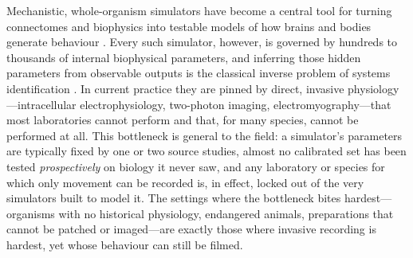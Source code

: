 \documentclass[11pt]{article}
\begin{document}
Mechanistic, whole-organism simulators have become a central tool for turning connectomes and biophysics into testable models of how brains and bodies generate behaviour \citep{wang2025baaiworm,shlizerman2025modworm,vaxenburg2025flybody,wangchen2024neuromechfly}. Every such simulator, however, is governed by hundreds to thousands of internal biophysical parameters, and inferring those hidden parameters from observable outputs is the classical inverse problem of systems identification \citep{villaverde2014reverse,spall2003introduction}. In current practice they are pinned by direct, invasive physiology---intracellular electrophysiology, two-photon imaging, electromyography---that most laboratories cannot perform and that, for many species, cannot be performed at all. This bottleneck is general to the field: a simulator's parameters are typically fixed by one or two source studies, almost no calibrated set has been tested \emph{prospectively} on biology it never saw, and any laboratory or species for which only movement can be recorded is, in effect, locked out of the very simulators built to model it. The settings where the bottleneck bites hardest---organisms with no historical physiology, endangered animals, preparations that cannot be patched or imaged---are exactly those where invasive recording is hardest, yet whose behaviour can still be filmed.
\end{document}
